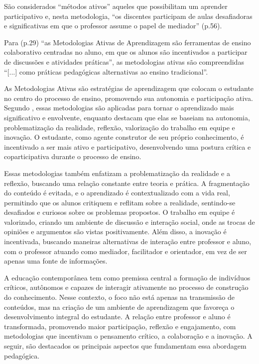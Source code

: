 São considerados ``métodos ativos'' aqueles que possibilitam um aprender participativo e, nesta metodologia, ``os discentes participam de aulas desafiadoras e significativas em que o professor assume o papel de mediador'' \cite{GOUVEIA2019} (p.56).

Para  (p.29) ``as Metodologias Ativas de Aprendizagem são ferramentas de ensino colaborativo centradas no aluno, em que os alunos são incentivados a participar de discussões e atividades práticas'', as metodologias ativas são compreendidas ``[...] como práticas pedagógicas alternativas ao ensino tradicional''.

As Metodologias Ativas são estratégias de aprendizagem que colocam o estudante no centro do processo de ensino, promovendo sua autonomia e participação ativa. Segundo , essas metodologias são aplicadas para tornar o aprendizado mais significativo e envolvente, enquanto  destacam que elas se baseiam na autonomia, problematização da realidade, reflexão, valorização do trabalho em equipe e inovação. O estudante, como agente construtor de seu próprio conhecimento, é incentivado a ser mais ativo e participativo, desenvolvendo uma postura crítica e coparticipativa durante o processo de ensino.

Essas metodologias também enfatizam a problematização da realidade e a reflexão, buscando uma relação constante entre teoria e prática. A fragmentação do conteúdo é evitada, e o aprendizado é contextualizado com a vida real, permitindo que os alunos critiquem e reflitam sobre a realidade, sentindo-se desafiados e curiosos sobre os problemas propostos. O trabalho em equipe é valorizado, criando um ambiente de discussão e interação social, onde as trocas de opiniões e argumentos são vistas positivamente. Além disso, a inovação é incentivada, buscando maneiras alternativas de interação entre professor e aluno, com o professor atuando como mediador, facilitador e orientador, em vez de ser apenas uma fonte de informações.

A educação contemporânea tem como premissa central a formação de indivíduos críticos, autônomos e capazes de interagir ativamente no processo de construção do conhecimento. Nesse contexto, o foco não está apenas na transmissão de conteúdos, mas na criação de um ambiente de aprendizagem que favoreça o desenvolvimento integral do estudante. A relação entre professor e aluno é transformada, promovendo maior participação, reflexão e engajamento, com metodologias que incentivam o pensamento crítico, a colaboração e a inovação. A seguir, são destacados os principais aspectos que fundamentam essa abordagem pedagógica.

